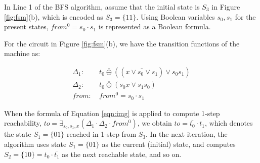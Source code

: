 \begin{figure}[H]
\end{figure}

In Line 1 of the BFS algorithm, assume that the initial state
is $S_3$ in Figure \ref{fig:fsm}(b), which is encoded as 
$S_3 = \{11\}$. Using Boolean variables $s_0, s_1$ for the present
states, $from^0 = s_0\cdot s_1$ is represented as a Boolean formula. 



\begin{Example}
For the circuit in Figure \ref{fig:fsm}(b), we have the transition
functions of the machine as:

\begin{align*}
\Delta_1: & ~t_0 \overline{\oplus} ((\overline{x \vee s_0 \vee s_1}) \vee s_0 s_1)\\
\Delta_2: & ~t_0 \overline{\oplus} (\overline{s_0}x \vee \overline{s_1}s_0)\\
from:     & ~from^0 = s_0\cdot s_1
\end{align*}

When the formula of Equation \ref{eqn:img} is applied to compute 1-step
reachability, $to = \exists _{s_0, s_1, x} (\Delta_1 \cdot \Delta_2
\cdot from^0)$, we obtain $to = \overline{t_0}\cdot t_1$, which denotes
the state $S_1 = \{01\}$ reached in 1-step from $S_3$.
In the next iteration, the algorithm uses state $S_1 = \{01\}$ as the
current (initial) state, and computes $S_2 = \{10\} = t_0\cdot
\overline{t_1}$ as the next reachable state, and so on. 
\end{Example}


